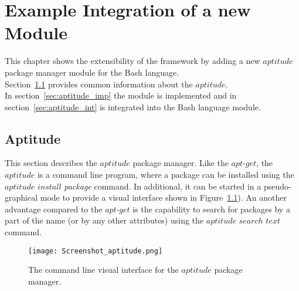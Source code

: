 
\chapter{Example Integration of a new Module}\label{chap:add}
This chapter shows the extensibility of the framework by adding a new $aptitude$ package manager module for the Bash language.\\
Section~\ref{sec:aptitude} provides common information about the $aptitude$.\\
In section~\ref{sec:aptitude_imp} the module is implemented and in section~\ref{sec:aptitude_int} is integrated into the Bash language module.

\section{Aptitude}\label{sec:aptitude}
This section describes the $aptitude$ package manager.
Like the $apt$-$get$, the $aptitude$ is a command line program, where a package can be installed using the $aptitude$ $install$ \emph{package} command. 
In additional, it can be started in a pseudo-graphical mode to provide a visual interface shown in Figure~\ref{fig:aptitude_gui}).
An another advantage compared to the $apt$-$get$ is the capability to search for packages by a part of the name (or by any other attributes) using the $aptitude$ $search$ $text$ command.
\begin{figure}[ht]   
	\centering
	\texttt{[image: Screenshot\_aptitude.png]}
	\caption{The command line visual interface for the $aptitude$ package manager.}
	\label{fig:aptitude_gui}
\end{figure}

